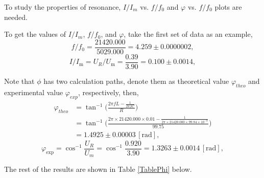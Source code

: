 \documentclass{article}
\begin{document}
To study the properties of resonance, $I/I_m$ vs. $f/f_0$ and $\varphi$ vs. $f/f_0$ plots are needed. 

To get the values of $I/I_m$, $f/f_0$, and $\varphi$, take the first set of data as an example,
$$f/f_0 = \frac{21420.000}{5029.000} = 4.259 \pm 0.0000002,$$
$$I/I_\text{m} = U_R/U_\text{m} = \frac{0.39}{3.90} = 0.100 \pm 0.0014,$$

Note that $\phi$ has two calculation paths, denote them as theoretical value $\varphi_{theo}$ and experimental value $\varphi_{exp}$, respectively, then,
\begin{align*}
    \varphi_{theo} & = \tan^{-1}\bigg(\frac{2\pi fL - \frac{1}{2\pi fC}}{R}\bigg)                                                                 \\
                   & = \tan^{-1}\bigg(\frac{2\pi\times 21420.000\times 0.01-\frac{1}{2\pi \times 21420.000\times 99.84\times10^{-9}}}{99.75}\bigg) \\
                   & = 1.4925 \pm 0.00003 \,[\text{rad}],
\end{align*}
$$
\varphi_\text{exp} = \cos^{-1}\frac{U_R}{U_m} = \cos^{-1}\frac{0.920}{3.90} = 1.3263 \pm 0.0014 \,[\text{rad}],
$$

The rest of the results are shown in Table \ref{TablePhi} below.
\end{document}
